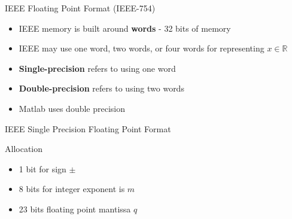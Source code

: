 \documentclass[10pt]{beamer}
\begin{document}
\begin{frame}{IEEE Floating Point Format (IEEE-754)}
  \begin{itemize}
  \item IEEE memory is built around \textbf{words} - 32 bits of memory 

 \item IEEE may use one word, two words, or four words for representing $x\in \mathbb{R}$

\item \textbf{Single-precision} refers to using one word 
\begin{center}
\end{center}

  \item \textbf{Double-precision} refers to using two words
\begin{center}
\end{center}
  \item Matlab uses double precision
\end{itemize}
\end{frame}
\begin{frame}{IEEE Single Precision Floating Point Format}


{}
\begin{center}
\end{center}

\begin{block}{Allocation}
\begin{itemize}
  \item 1 bit for sign $\pm $
  \item 8 bits for integer exponent is $m$
  \item 23 bits floating point mantissa $q$
  
\end{itemize}
\end{block}
\end{frame}
\end{document}
